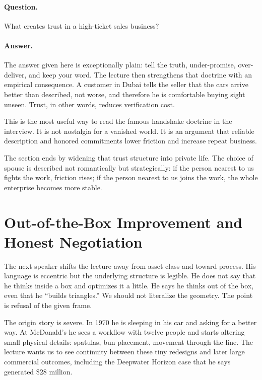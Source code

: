 \paragraph{Question.} What creates trust in a high-ticket sales business?

\paragraph{Answer.} The answer given here is exceptionally plain: tell the truth, under-promise, over-deliver, and keep your word. The lecture then strengthens that doctrine with an empirical consequence. A customer in Dubai tells the seller that the cars arrive better than described, not worse, and therefore he is comfortable buying sight unseen. Trust, in other words, reduces verification cost.

This is the most useful way to read the famous handshake doctrine in the interview. It is not nostalgia for a vanished world. It is an argument that reliable description and honored commitments lower friction and increase repeat business.

The section ends by widening that trust structure into private life. The choice of spouse is described not romantically but strategically: if the person nearest to us fights the work, friction rises; if the person nearest to us joins the work, the whole enterprise becomes more stable.

\section{Out-of-the-Box Improvement and Honest Negotiation}

The next speaker shifts the lecture away from asset class and toward process. His language is eccentric but the underlying structure is legible. He does not say that he thinks inside a box and optimizes it a little. He says he thinks out of the box, even that he ``builds triangles.'' We should not literalize the geometry. The point is refusal of the given frame.

The origin story is severe. In 1970 he is sleeping in his car and asking for a better way. At McDonald's he sees a workflow with twelve people and starts altering small physical details: spatulas, bun placement, movement through the line. The lecture wants us to see continuity between these tiny redesigns and later large commercial outcomes, including the Deepwater Horizon case that he says generated \$28 million.

